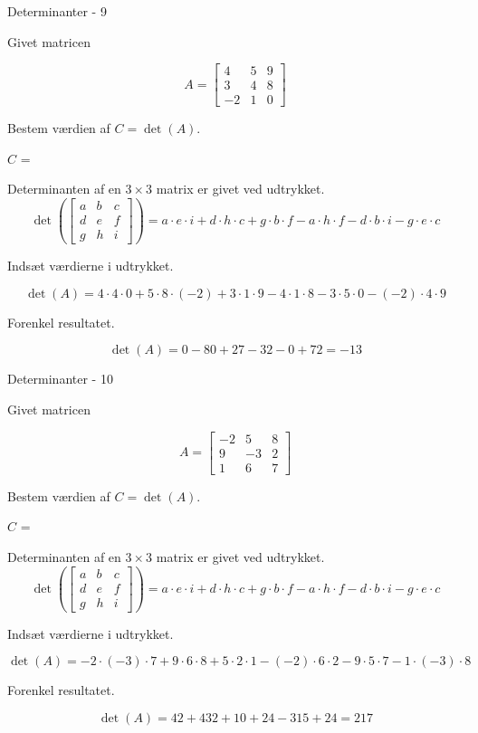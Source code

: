 \documentclass{article}
\begin{document}
\begin{exercise}{Determinanter - 9}

Givet matricen

\[
A = \left[\begin{array}{rrr}
4 & 5 & 9 \\
3 & 4 & 8 \\
-2 & 1 & 0
\end{array} \right]
\]

Bestem værdien af $C = \det(A)$.

$C$ = 

\hint
Determinanten af en $3 \times 3$ matrix er givet ved udtrykket.
\[
\det \left( \left[\begin{array}{rrr}
a & b & c \\
d & e & f \\
g & h & i
\end{array} \right] \right) = a \cdot e \cdot i + d \cdot h \cdot c + g \cdot b \cdot f - a \cdot h \cdot f - d \cdot b \cdot i - g \cdot e \cdot c
\]

\hint
Indsæt værdierne i udtrykket.

\hint
\[
\det \left( A \right) = 4 \cdot 4 \cdot 0 + 5 \cdot 8 \cdot (-2) + 3 \cdot 1 \cdot 9 - 4 \cdot 1 \cdot 8 - 3 \cdot 5 \cdot 0 - (-2) \cdot 4 \cdot 9
\]

\hint
Forenkel resultatet.

\hint
\[
\det \left( A \right) = 0 - 80 + 27 - 32 - 0 + 72 = -13
\]

\end{exercise}


\begin{exercise}{Determinanter - 10}

Givet matricen

\[
A = \left[\begin{array}{rrr}
-2 & 5 & 8 \\
9 & -3 & 2 \\
1 & 6 & 7
\end{array} \right]
\]

Bestem værdien af $C = \det(A)$.

$C$ = 

\hint
Determinanten af en $3 \times 3$ matrix er givet ved udtrykket.
\[
\det \left( \left[\begin{array}{rrr}
a & b & c \\
d & e & f \\
g & h & i
\end{array} \right] \right) = a \cdot e \cdot i + d \cdot h \cdot c + g \cdot b \cdot f - a \cdot h \cdot f - d \cdot b \cdot i - g \cdot e \cdot c
\]

\hint
Indsæt værdierne i udtrykket.

\hint
\[
\det \left( A \right) = -2 \cdot (-3) \cdot 7 + 9 \cdot 6 \cdot 8 + 5 \cdot 2 \cdot 1 - (-2) \cdot 6 \cdot 2 - 9 \cdot 5 \cdot 7 - 1 \cdot (-3) \cdot 8
\]

\hint
Forenkel resultatet.

\hint
\[
\det \left( A \right) = 42 + 432 + 10 + 24 - 315 + 24 = 217
\]

\end{exercise}
\end{document}
